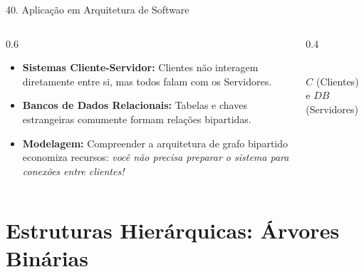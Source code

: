 \documentclass[9pt]{beamer}
\begin{document}
    \begin{frame}{40. Aplicação em Arquitetura de Software}
        \begin{columns}
            \begin{column}{0.6\textwidth}
                \begin{itemize}
                    \item \textbf{Sistemas Cliente-Servidor:} Clientes não interagem diretamente entre si, mas todos falam com os Servidores.
                    \item \textbf{Bancos de Dados Relacionais:} Tabelas e chaves estrangeiras comumente formam relações bipartidas.
                    \item \textbf{Modelagem:} Compreender a arquitetura de grafo bipartido economiza recursos: \textit{você não precisa preparar o sistema para conexões entre clientes!}
                \end{itemize}
            \end{column}
            \begin{column}{0.4\textwidth}
                \centering
                \\
                \vspace{0.2cm}
                \tiny $C$ (Clientes) e $DB$ (Servidores)
            \end{column}
        \end{columns}
    \end{frame}

    \section{Estruturas Hierárquicas: Árvores Binárias}
\end{document}

